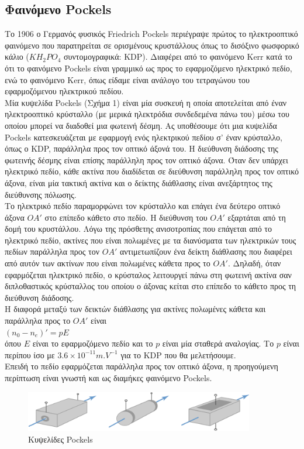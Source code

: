 \documentclass[a4paper,11pt,titlepage]{article}
\begin{document}
\subsection{Φαινόμενο Pockels}

Το 1906 ο Γερμανός φυσικός Friedrich Pockels περιέγραψε πρώτος το ηλεκτροοπτικό φαινόμενο που παρατηρείται σε ορισμένους κρυστάλλους όπως το δισόξινο φωσφορικό κάλιο ($KH_2PO_4$ συντομογραφικά: KDP). Διαφέρει από το φαινόμενο Kerr κατά το ότι το φαινόμενο Pockels είναι γραμμικό ως προς το εφαρμοζόμενο ηλεκτρικό πεδίο, ενώ το φαινόμενο Kerr, όπως είδαμε είναι ανάλογο του τετραγώνου του εφαρμοζόμενου ηλεκτρικού πεδίου.\\
Μία κυψελίδα Pockels (Σχήμα 1) είναι μία συσκευή η οποία αποτελείται από έναν ηλεκτροοπτικό κρύσταλλο (με μερικά ηλεκτρόδια συνδεδεμένα πάνω του) μέσω του οποίου μπορεί να διαδοθεί μια φωτεινή δέσμη. Ας υποθέσουμε ότι μια κυψελίδα Pockels κατεσκευάζεται με εφαρμογή ενός ηλεκτρικού πεδίου σ' έναν κρύσταλλο, όπως ο KDP, παράλληλα προς τον οπτικό άξονά του. Η διεύθυνση διάδοσης της φωτεινής δέσμης είναι επίσης παράλληλη προς τον οπτικό άξονα. Όταν δεν υπάρχει ηλεκτρικό πεδίο, κάθε ακτίνα που διαδίδεται σε διεύθυνση παράλληλη προς τον οπτικό άξονα, είναι μία τακτική ακτίνα και ο δείκτης διάθλασης είναι ανεξάρτητος της διεύθυνσης πόλωσης.\\
Το ηλεκτρικό πεδίο παραμορφώνει τον κρύσταλλο και επάγει ένα δεύτερο οπτικό άξονα $OA'$ στο επίπεδο κάθετο στο πεδίο. Η διεύθυνση του $OA'$ εξαρτάται από τη δομή του κρυστάλλου. Λόγω της πρόσθετης ανισοτροπίας που επάγεται από το ηλεκτρικό πεδίο, ακτίνες που είναι πολωμένες με τα διανύσματα των ηλεκτρικών τους πεδίων παράλληλα προς τον $OA'$ αντιμετωπίζουν ένα δείκτη διάθλασης που διαφέρει από αυτόν των ακτίνων που είναι πολωμένες κάθετα προς το $OA'$. Δηλαδή, όταν εφαρμόζεται ηλεκτρικό πεδίο, ο κρύσταλος λειτουργεί πάνω στη φωτεινή ακτίνα σαν διπλοθαστικός κρύσταλλος του οποίου ο άξονας κείται στο επίπεδο το κάθετο προς τη διεύθυνση διάδοσης. \\
Η διαφορά μεταξύ των δεικτών διάθλασης για ακτίνες πολωμένες κάθετα και παράλληλα προς το $OA'$ είναι \\[7pt]
$(n_0-n_e)' = pE$\\[7pt]
όπου $E$ είναι το εφαρμοζόμενο πεδίο και το $p$ είναι μία σταθερά αναλογίας. Το $p$ είναι περίπου ίσο με $3.6\times 10^{-11}m.V^{-1}$ για το KDP που θα μελετήσουμε.\\
Επειδή το πεδίο εφαρμόζεται παράλληλα προς τον οπτικό άξονα, η προηγούμενη περίπτωση είναι γνωστή και ως διαμήκες φαινόμενο Pockels.
\begin{figure} [bph!]
\centering
\includegraphics[width=100mm]{pockels_cells.png}
\caption{Κυψελίδες Pockels}
\end{figure}
\end{document}
